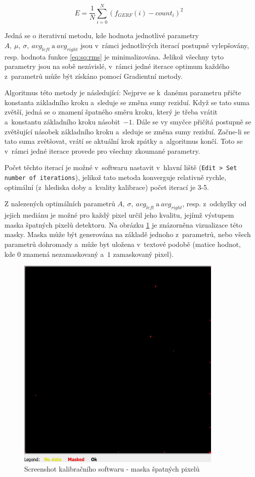 \begin{equation}\label{eq:sq:rms}
	E = \frac{1}{N} \sum_{i=0}^{N}(f_{GERF}(i) - count_i)^2
\end{equation}

Jedná se o iterativní metodu, kde hodnota jednotlivé parametry $A,~\mu,~\sigma,~avg_{left}~\text{a}~avg_{right}$ jsou v~rámci jednotlivých iterací postupně vylepšovány, resp. hodnota funkce \ref{eq:sq:rms} je minimalizována. Jelikož všechny tyto parametry jsou na sobě nezávislé, v~rámci jedné iterace optimum každého z~parametrů může být získáno pomocí Gradientní metody.

Algoritmus této metody je následující: Nejprve se k~danému parametru přičte konstanta základního kroku a~sleduje se změna sumy reziduí. Když se tato suma zvětší, jedná se o znamení špatného směru kroku, který je třeba vrátit a~konstantu základního kroku násobit~$-1$. Dále se vy smyčce přičítá postupně se zvětšující násobek základního kroku a~sleduje se změna sumy reziduí. Začne-li se tato suma zvětšovat, vrátí se aktuální krok zpátky a~algoritmus končí. Toto se v~rámci jedné iterace provede pro všechny zkoumané parametry.

Počet těchto iterací je možné v~softwaru nastavit v~hlavní liště (\texttt{Edit > Set number of iterations}), jelikož tato metoda konverguje relativně rychle, optimální (z~hlediska doby a~kvality kalibrace) počet iterací je 3-5.

Z nalezených optimálních parametrů $A,~\sigma,~avg_{left}~\text{a}~avg_{right}$, resp. z~odchylky od jejich mediánu je možné pro každý pixel určil jeho kvalitu, jejímž výstupem maska špatných pixelů detektoru. Na obrázku \ref{fig:calib:sw_mask} je znázorněna vizualizace této masky. Maska může být generována na základě jednoho z~parametrů, nebo všech parametrů dohromady a~může byt uložena v~textové podobě (matice hodnot, kde $0$ znamená nezamaskovaný a~$1$ zamaskovaný pixel).

\begin{figure}[th!]
	\begin{center}
		\includegraphics[width=10cm]{figures/calibsw_mask.png}
		\caption{Screenshot kalibračního softwaru - maska špatných pixelů}
		\label{fig:calib:sw_mask}
	\end{center}
\end{figure}


